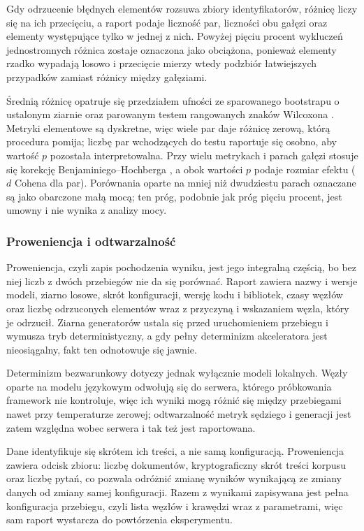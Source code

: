 Gdy odrzucenie błędnych elementów rozsuwa zbiory identyfikatorów, różnicę liczy się na ich
przecięciu, a raport podaje liczność par, liczności obu gałęzi oraz elementy występujące tylko w
jednej z nich. Powyżej pięciu procent wykluczeń jednostronnych różnica zostaje oznaczona jako
obciążona, ponieważ elementy rzadko wypadają losowo i przecięcie mierzy wtedy podzbiór
łatwiejszych przypadków zamiast różnicy między gałęziami.

Średnią różnicę opatruje się przedziałem ufności ze sparowanego bootstrapu o ustalonym ziarnie
oraz parowanym testem rangowanych znaków Wilcoxona \cite{wilcoxon1945individual,
efron1979bootstrap}. Metryki elementowe są dyskretne, więc wiele par daje różnicę zerową, którą
procedura pomija; liczbę par wchodzących do testu raportuje się osobno, aby wartość $p$ pozostała
interpretowalna. Przy wielu metrykach i parach gałęzi stosuje się korekcję Benjaminiego--Hochberga
\cite{benjamini1995fdr}, a obok wartości $p$ podaje rozmiar efektu ($d$ Cohena dla par).
Porównania oparte na mniej niż dwudziestu parach oznaczane są jako obarczone małą mocą; ten próg,
podobnie jak próg pięciu procent, jest umowny i nie wynika z analizy mocy.

\subsubsection{Proweniencja i odtwarzalność}
Proweniencja, czyli zapis pochodzenia wyniku, jest jego integralną częścią, bo bez niej liczb z
dwóch przebiegów nie da się porównać. Raport zawiera nazwy i wersje modeli, ziarno losowe, skrót
konfiguracji, wersję kodu i bibliotek, czasy węzłów oraz liczbę odrzuconych elementów wraz z
przyczyną i wskazaniem węzła, który je odrzucił. Ziarna generatorów ustala się przed
uruchomieniem przebiegu i wymusza tryb deterministyczny, a gdy pełny determinizm akceleratora jest
nieosiągalny, fakt ten odnotowuje się jawnie.

Determinizm bezwarunkowy dotyczy jednak wyłącznie modeli lokalnych. Węzły oparte na modelu
językowym odwołują się do serwera, którego próbkowania framework nie kontroluje, więc ich wyniki
mogą różnić się między przebiegami nawet przy temperaturze zerowej; odtwarzalność metryk sędziego
i generacji jest zatem względna wobec serwera i tak też jest raportowana.

Dane identyfikuje się skrótem ich treści, a nie samą konfiguracją. Proweniencja zawiera odcisk
zbioru: liczbę dokumentów, kryptograficzny skrót treści korpusu oraz liczbę pytań, co pozwala
odróżnić zmianę wyników wynikającą ze zmiany danych od zmiany samej konfiguracji. Razem z
wynikami zapisywana jest pełna konfiguracja przebiegu, czyli lista węzłów i krawędzi wraz z
parametrami, więc sam raport wystarcza do powtórzenia eksperymentu.

